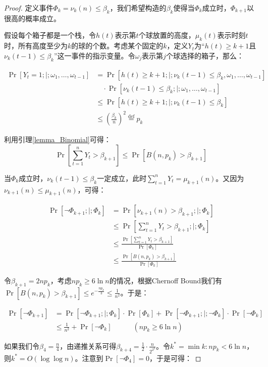\documentclass[lang=cn,newtx,10pt,scheme=chinese,chinesefont=nofont,citestyle=gb7714-2015, bibstyle=gb7714-2015]{elegantbook}
\begin{document}
\begin{refsection}
\begin{proof}
定义事件$\Phi_k={\nu_k(n)\le \beta_k}$，我们希望构造的$\beta_k$使得当$\Phi_k$成立时，$\Phi_{k+1}$以很高的概率成立。

假设每个箱子都是一个栈，令$h(t)$表示第$t$个球放置的高度，$\mu_k(t)$表示时刻$t$时，所有高度至少为$k$的球的个数。考虑某个固定的$k$，定义$Y_t$为“$h(t)\ge k+1$且$\nu_k(t-1)\le \beta_k$”这一事件的指示变量。令$\omega_j$表示第$j$个球选择的箱子，那么：

\begin{align*}
\Pr[Y_t=1;|;\omega_1,\dots,\omega_{t-1}] &= \Pr[h(t)\ge k+1 ;|; \nu_k(t-1)\le\beta_k,\omega_1,\dots,\omega_{t-1}] \\
&\quad \cdot \Pr[\nu_k(t-1)\le \beta_k ;|; \omega_1,\dots,\omega_{t-1}] \\
&\le \Pr[h(t)\ge k+1 ;|; \nu_k(t-1)\le\beta_k] \\
&\le \left(\frac{\beta_k}{n}\right)^2 \overset{\mathrm{def}}{=} p_k
\end{align*}

利用引理\ref{lemma_Binomial}可得：
\begin{equation*}
\Pr\left[\sum_{t=1}^n Y_t > \beta_{k+1}\right] \le \Pr[B(n, p_k)>\beta_{k+1}]
\end{equation*}

当$\Phi_k$成立时，$\nu_k(t-1)\le \beta_k$一定成立，此时$\sum_{t=1}^n Y_t=\mu_{k+1}(n)$。又因为$\nu_{k+1}(n) \le \mu_{k+1}(n)$，可得：

\begin{align*}
\Pr[\neg\Phi_{k+1} ;|; \Phi_k] &= \Pr[\nu_{k+1}(n)>\beta_{k+1} ;|; \Phi_k] \\
&\le \Pr\left[\sum_{t=1}^n Y_t >\beta_{k+1} ;|; \Phi_k\right] \\
&\le \frac{\Pr\left[\sum_{t=1}^n Y_t > \beta_{k+1}\right]}{\Pr[\Phi_k]} \\
&\le \frac{\Pr[B(n,p_k) > \beta_{k+1}]}{\Pr[\Phi_k]}
\end{align*}

令$\beta_{k+1}=2np_k$，考虑$np_k\ge 6\ln n$的情况，根据Chernoff Bound我们有$\Pr[B(n,p_k)>\beta_{k+1}] \le e^{-\frac{np_k}{3}} \le\frac{1}{n^2}$。于是：

\begin{align*}
\Pr[\neg \Phi_{k+1}] &= \Pr[\neg \Phi_{k+1} ;|; \Phi_{k}] \cdot \Pr[\Phi_k] + \Pr[\neg \Phi_{k+1} ;|; \neg\Phi_{k}] \cdot \Pr[\neg\Phi_k] \\
&\le \frac{1}{n^2} + \Pr[\neg \Phi_k] \quad\quad\quad(np_k \ge 6\ln n)
\end{align*}

如果我们令$\beta_4=\frac{n}{4}$，由递推关系可得$\beta_{k+4}=\frac{1}{2}\cdot\frac{n}{2^{2^k}}$。令$k^*=\min{k:np_k<6\ln n}$，则$k^*=O(\log\log n)$。注意到$\Pr[\neg\Phi_4]=0$，于是可得：


\end{proof}
\end{refsection}
\end{document}
